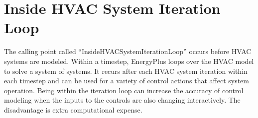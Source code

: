 \section{Inside HVAC System Iteration Loop}\label{inside-hvac-system-iteration-loop}

The calling point called ``InsideHVACSystemIterationLoop'' occurs before HVAC systems are modeled. Within a timestep, EnergyPlus loops over the HVAC model to solve a system of systems. It recurs after each HVAC system iteration within each timestep and can be used for a variety of control actions that affect system operation. Being within the iteration loop can increase the accuracy of control modeling when the inputs to the controls are also changing interactively. The disadvantage is extra computational expense.
